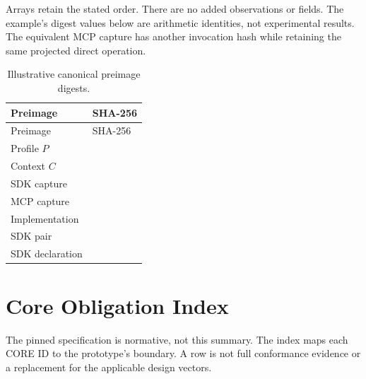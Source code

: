 \documentclass[11pt,letterpaper]{article}
\begin{document}
Arrays retain the stated order. There are no added observations or fields.
The example's digest values below are arithmetic identities, not experimental
results. The equivalent MCP capture has another invocation hash while retaining
the same projected direct operation.

\begin{longtable}{@{}L{.23\linewidth}L{.71\linewidth}@{}}
\caption{Illustrative canonical preimage digests.}\label{tab:examplehash}\\
\toprule Preimage & SHA-256 \\ \midrule
\endfirsthead
\toprule Preimage & SHA-256 \\ \midrule
\endhead
Profile $P$ &  \\
Context $C$ &  \\
SDK capture &  \\
MCP capture &  \\
Implementation &  \\
SDK pair &  \\
SDK declaration &  \\
\bottomrule
\end{longtable}

\section{Core Obligation Index}

The pinned specification is normative, not this summary. The index maps each
CORE ID to the prototype's boundary. A row is not full conformance evidence or
a replacement for the applicable design vectors.
\end{document}

